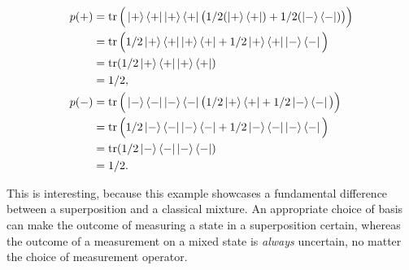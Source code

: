 \begin{align}
    p(+) &= \operatorname{tr}\Big(\ket{+}\bra{+}\ket{+}\bra{+}\big(1/2 (\ket{+}\bra{+}) + 1/2 (\ket{-}\bra{-})\big)\Big)\\
         &= \operatorname{tr}\Big(1/2 \ket{+}\bra{+}\ket{+}\bra{+} + 1/2 \ket{+}\bra{+}\ket{-}\bra{-}\Big)\\
         &= \operatorname{tr}(1/2 \ket{+}\bra{+}\ket{+}\bra{+})\\
         &= 1/2,\\
    p(-) &= \operatorname{tr}\Big(\ket{-}\bra{-}\ket{-}\bra{-}\big(1/2 \ket{+}\bra{+} + 1/2 \ket{-}\bra{-}\big)\Big)\\
         &= \operatorname{tr}\Big(1/2 \ket{-}\bra{-}\ket{-}\bra{-} + 1/2 \ket{-}\bra{-}\ket{-}\bra{-}\Big)\\
         &= \operatorname{tr}(1/2 \ket{-}\bra{-}\ket{-}\bra{-})\\
         &= 1/2.
\end{align}

This is interesting, because this example showcases a fundamental difference between a superposition and a classical mixture. An appropriate choice of basis can make the outcome of measuring a state in a superposition certain, whereas the outcome of a measurement on a mixed state is \textit{always} uncertain, no matter the choice of measurement operator.

